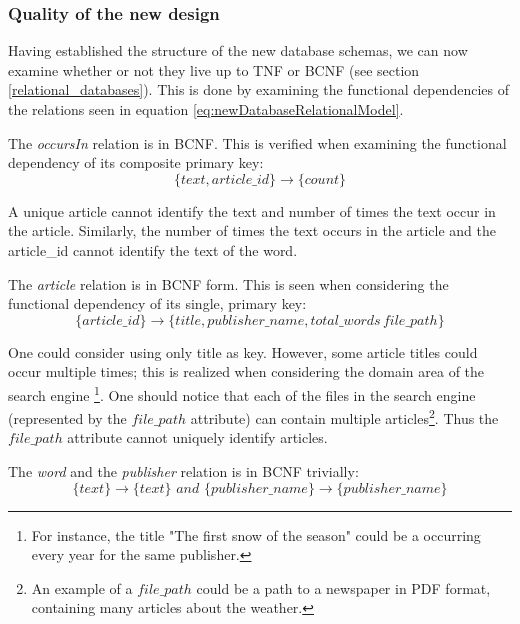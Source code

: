 \subsubsection*{Quality of the new design}
Having established the structure of the new database schemas, we can now examine whether or not they live up to TNF or BCNF (see section \ref{relational_databases}).
This is done by examining the functional dependencies of the relations seen in equation \ref{eq:newDatabaseRelationalModel}.

The \textit{occursIn} relation is in BCNF. 
This is verified when examining the functional dependency of its composite primary key:
\begin{equation*}
 \{text,article\_id\}\rightarrow \{count\}   
\end{equation*}

A unique article cannot identify the text and number of times the text occur in the article.
Similarly, the number of times the text occurs in the article and the article\_id cannot identify the text of the word.

The \textit{article} relation is in BCNF form. 
This is seen when considering the functional dependency of its single, primary key:
\begin{equation*}
    \{article\_id\} \rightarrow \{title, publisher\_name,total\_words\, file\_path\}
\end{equation*}

One could consider using only title as key. 
However, some article titles could occur multiple times; this is realized when considering the domain area of the \knox{} search engine
\footnote{For instance, the title "The first snow of the season" could be a occurring every year for the same publisher.}.
One should notice that each of the files in the search engine (represented by the $file\_path$ attribute) can contain multiple articles\footnote{An example of a $file\_path$ could be a path to a newspaper in PDF format, containing many articles about the weather.}.
Thus the $file\_path$ attribute cannot uniquely identify articles. 

The \textit{word} and the \textit{publisher} relation is in BCNF trivially:
\begin{equation*}
    \{ text\} \rightarrow \{text\} \textit{\ and\ } \{ publisher\_name \} \rightarrow \{ publisher\_name\}
\end{equation*}

